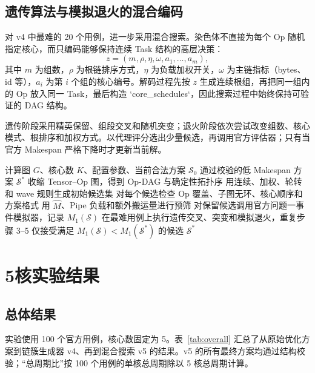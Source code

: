 \subsection{遗传算法与模拟退火的混合编码}

对 v4 中最难的 20 个用例，进一步采用混合搜索。染色体不直接为每个 Op 随机指定核心，而只编码能够保持连续 Task 结构的高层决策：
\begin{equation}
z=(m,\rho,\eta,\omega,a_1,\ldots,a_m),
\end{equation}
其中 $m$ 为组数，$\rho$ 为根链排序方式，$\eta$ 为负载加权开关，$\omega$ 为主链指标（bytes、id 等），$a_i$ 为第 $i$ 个组的核心编号。解码过程先按 $z$ 生成连续根组，再把同一组内的 Op 放入同一 Task，最后构造 `core\_schedules`，因此搜索过程中始终保持可验证的 DAG 结构。

遗传阶段采用精英保留、组段交叉和随机突变；退火阶段依次尝试改变组数、核心模式、根排序和加权方式。以代理评分选出少量候选，再调用官方评估器；只有当官方 Makespan 严格下降时才更新当前解。

\begin{algorithm}[htbp]
\caption{问题一的候选生成与官方评估闭环}
\label{alg:problem1}
\begin{algorithmic}[1]
\Require 计算图 $G$、核心数 $K$、配置参数、当前合法方案 $\mathcal S_0$
\Ensure 通过校验的低 Makespan 方案 $\mathcal S^*$
\State 收缩 Tensor--Op 图，得到 Op-DAG 与确定性拓扑序
\State 用连续、加权、轮转和 wave 规则生成初始候选集
\State 对每个候选检查 Op 覆盖、子图无环、核心顺序和方案格式
\State 用 $\widehat M$、Pipe 负载和额外搬运量进行预筛
\State 对保留候选调用官方问题一事件模拟器，记录 $M_1(\mathcal S)$
\State 在最难用例上执行遗传交叉、突变和模拟退火，重复步骤 3--5
\State 仅接受满足 $M_1(\mathcal S)<M_1(\mathcal S^*)$ 的候选
\State \Return $\mathcal S^*$
\end{algorithmic}
\end{algorithm}

\section{5核实验结果}

\subsection{总体结果}

实验使用 100 个官方用例，核心数固定为 5。表~\ref{tab:overall} 汇总了从原始优化方案到链簇生成器 v4、再到混合搜索 v5 的结果。v5 的所有最终方案均通过结构校验；“总周期比”按 100 个用例的单核总周期除以 5 核总周期计算。

